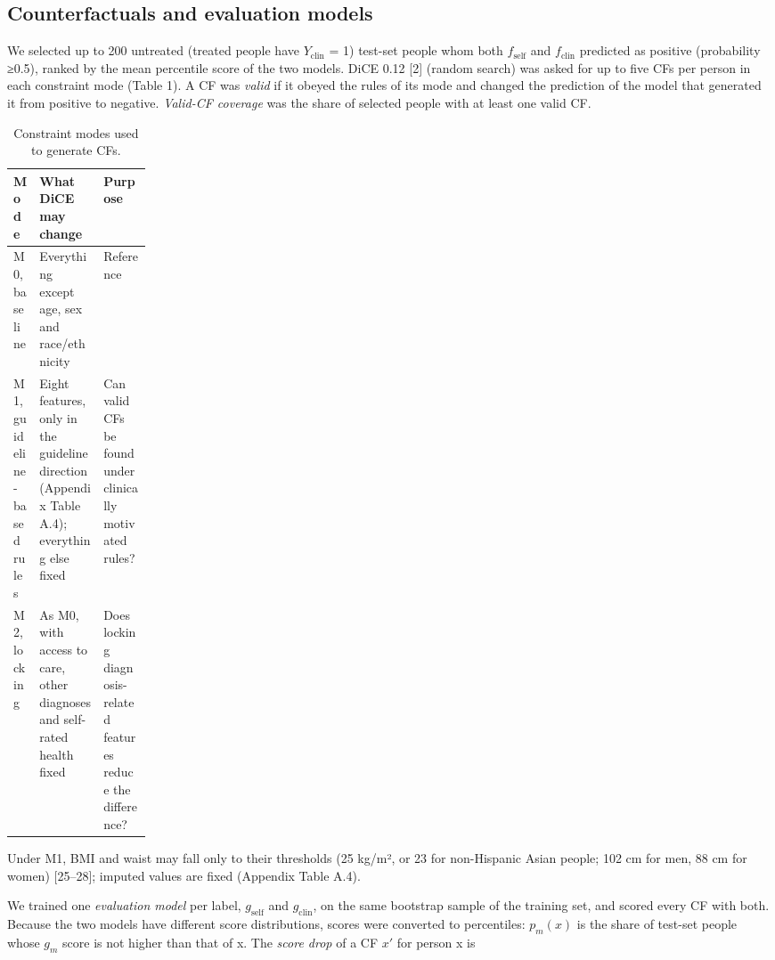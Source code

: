 \documentclass[final,5p,times,twocolumn]{elsarticle}
\begin{document}
\subsection{Counterfactuals and evaluation models}

We selected up to 200 untreated (treated people have
\(Y_{\mathrm{clin}}\) = 1) test-set people whom both
\(f_{\mathrm{self}}\) and \(f_{\mathrm{clin}}\) predicted as positive
(probability ≥0.5), ranked by the mean percentile score of the two
models. DiCE 0.12 {[}2{]} (random search) was asked for up to five CFs
per person in each constraint mode (Table 1). A CF was \emph{valid} if
it obeyed the rules of its mode and changed the prediction of the model
that generated it from positive to negative. \emph{Valid-CF coverage}
was the share of selected people with at least one valid CF.

\begin{table}[!htbp]
\caption{Constraint modes used to generate CFs.}
\label{tab1}
\footnotesize{}\selectfont\renewcommand{\arraystretch}{1.1}
\begin{tabularx}{\textwidth}{>{\raggedright\arraybackslash}p{0.18\linewidth}>{\raggedright\arraybackslash}X>{\raggedright\arraybackslash}X}
\toprule
\textbf{Mode} & \textbf{What DiCE may change} & \textbf{Purpose} \\ \midrule
M0, baseline & Everything except age, sex and race/ethnicity & Reference \\
M1, guideline-based rules & Eight features, only in the guideline direction (Appendix Table A.4); everything else fixed & Can valid CFs be found under clinically motivated rules? \\
M2, locking & As M0, with access to care, other diagnoses and self-rated health fixed & Does locking diagnosis-related features reduce the difference? \\
\bottomrule
\end{tabularx}
\end{table}

Under M1, BMI and waist may fall only to their thresholds (25 kg/m², or
23 for non-Hispanic Asian people; 102 cm for men, 88 cm for women)
{[}25--28{]}; imputed values are fixed (Appendix Table A.4).

We trained one \emph{evaluation model} per label, \(g_{\mathrm{self}}\)
and \(g_{\mathrm{clin}}\), on the same bootstrap sample of the training
set, and scored every CF with both. Because the two models have
different score distributions, scores were converted to percentiles:
\(p_m(x)\) is the share of test-set people whose \(g_m\) score is not
higher than that of x. The \emph{score drop} of a CF \(x'\) for person x
is
\end{document}
